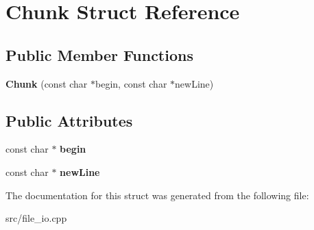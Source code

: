 \hypertarget{structChunk}{}\section{Chunk Struct Reference}
\label{structChunk}
\subsection*{Public Member Functions}
\begin{DoxyCompactItemize}
\item 
\mbox{\label{structChunk_a6bcebb0e47d7edcdfc0814efd2aef1ae}} 
{\bfseries Chunk} (const char $\ast$begin, const char $\ast$new\+Line)
\end{DoxyCompactItemize}
\subsection*{Public Attributes}
\begin{DoxyCompactItemize}
\item 
\mbox{\label{structChunk_ac1330b0d79577428a3727b8a383c53c3}} 
const char $\ast$ {\bfseries begin}
\item 
\mbox{\label{structChunk_a17555e7645ce9415de721cc682d18346}} 
const char $\ast$ {\bfseries new\+Line}
\end{DoxyCompactItemize}


The documentation for this struct was generated from the following file\+:\begin{DoxyCompactItemize}
\item 
src/file\+\_\+io.\+cpp\end{DoxyCompactItemize}
